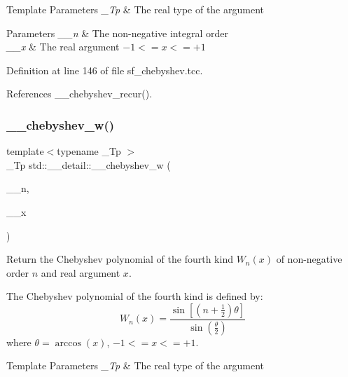 \begin{DoxyTemplParams}{Template Parameters}
{\em \+\_\+\+Tp} & The real type of the argument \\
\hline
\end{DoxyTemplParams}

\begin{DoxyParams}{Parameters}
{\em \+\_\+\+\_\+n} & The non-\/negative integral order \\
\hline
{\em \+\_\+\+\_\+x} & The real argument $ -1 <= x <= +1 $ \\
\hline
\end{DoxyParams}


Definition at line 146 of file sf\+\_\+chebyshev.\+tcc.



References \+\_\+\+\_\+chebyshev\+\_\+recur().

\mbox{\label{namespacestd_1_1____detail_ae220390e755bdc4908e040fd68426d14}} 
\subsubsection{\texorpdfstring{\+\_\+\+\_\+chebyshev\+\_\+w()}{\_\_chebyshev\_w()}}
{\footnotesize\ttfamily template$<$typename \+\_\+\+Tp $>$ \\
\+\_\+\+Tp std\+::\+\_\+\+\_\+detail\+::\+\_\+\+\_\+chebyshev\+\_\+w (\begin{DoxyParamCaption}\item[{unsigned int}]{\+\_\+\+\_\+n,  }\item[{\+\_\+\+Tp}]{\+\_\+\+\_\+x }\end{DoxyParamCaption})}

Return the Chebyshev polynomial of the fourth kind $ W_n(x) $ of non-\/negative order $ n $ and real argument $ x $.

The Chebyshev polynomial of the fourth kind is defined by\+: \[ W_n(x) = \frac{\sin \left[ \left(n+\frac{1}{2}\right)\theta \right]} {\sin \left(\frac{\theta}{2}\right)} \] where $ \theta = \arccos(x) $, $ -1 <= x <= +1 $.


\begin{DoxyTemplParams}{Template Parameters}
{\em \+\_\+\+Tp} & The real type of the argument \\
\hline
\end{DoxyTemplParams}

